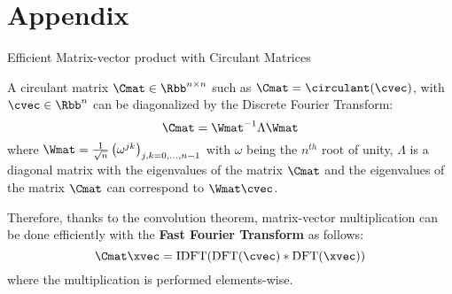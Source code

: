 \section{Appendix}



\begin{frame}{Efficient Matrix-vector product with Circulant Matrices}

  A circulant matrix $\Cmat \in \Rbb^{n \times n}$ such as $\Cmat = \circulant (\cvec)$, with $\cvec \in \Rbb^n$ can be diagonalized by the Discrete Fourier Transform:
  \begin{equation*}
      \Cmat = \Wmat^{-1} \Lambda \Wmat
  \end{equation*}
  where $\Wmat = \frac{1}{\sqrt{n}} \left( \omega^{jk} \right)_{j,k = 0, \dots, n-1}$ with $\omega$ being the $n^{th}$ root of unity, $\Lambda$ is a diagonal matrix with the eigenvalues of the matrix $\Cmat$ and the eigenvalues of the matrix $\Cmat$ can correspond to $\Wmat \cvec$. 

  Therefore, thanks to the convolution theorem, matrix-vector multiplication can be done efficiently with the \textbf{Fast Fourier Transform} as follows:
  \begin{equation*}
    \Cmat \xvec = \mathrm{IDFT}( \mathrm{DFT}(\cvec) * \mathrm{DFT}(\xvec) )
  \end{equation*}
  where the multiplication is performed elements-wise. 
\end{frame}




